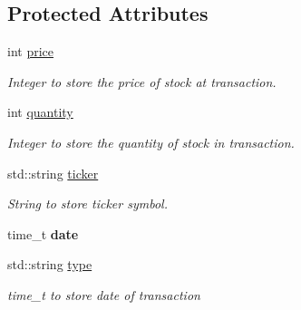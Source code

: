 \subsection*{Protected Attributes}
\begin{DoxyCompactItemize}
\item 
\mbox{\label{class_transaction_type_a079b40eebde548904529841f8746d4ff}} 
int \mbox{\hyperlink{class_transaction_type_a079b40eebde548904529841f8746d4ff}{price}}
\begin{DoxyCompactList}\small\item\em Integer to store the price of stock at transaction. \end{DoxyCompactList}\item 
\mbox{\label{class_transaction_type_a60b6221cf4b0bf30f5c4a4e15893b98d}} 
int \mbox{\hyperlink{class_transaction_type_a60b6221cf4b0bf30f5c4a4e15893b98d}{quantity}}
\begin{DoxyCompactList}\small\item\em Integer to store the quantity of stock in transaction. \end{DoxyCompactList}\item 
\mbox{\label{class_transaction_type_aad758d557417a18c944dc9849a390391}} 
std\+::string \mbox{\hyperlink{class_transaction_type_aad758d557417a18c944dc9849a390391}{ticker}}
\begin{DoxyCompactList}\small\item\em String to store ticker symbol. \end{DoxyCompactList}\item 
\mbox{\label{class_transaction_type_afb98c9a6a95e2fd8157448edb9eeecce}} 
time\+\_\+t {\bfseries date}
\item 
\mbox{\label{class_transaction_type_a8052c2576840eba8072c008022f38d51}} 
std\+::string \mbox{\hyperlink{class_transaction_type_a8052c2576840eba8072c008022f38d51}{type}}
\begin{DoxyCompactList}\small\item\em time\+\_\+t to store date of transaction \end{DoxyCompactList}\end{DoxyCompactItemize}


